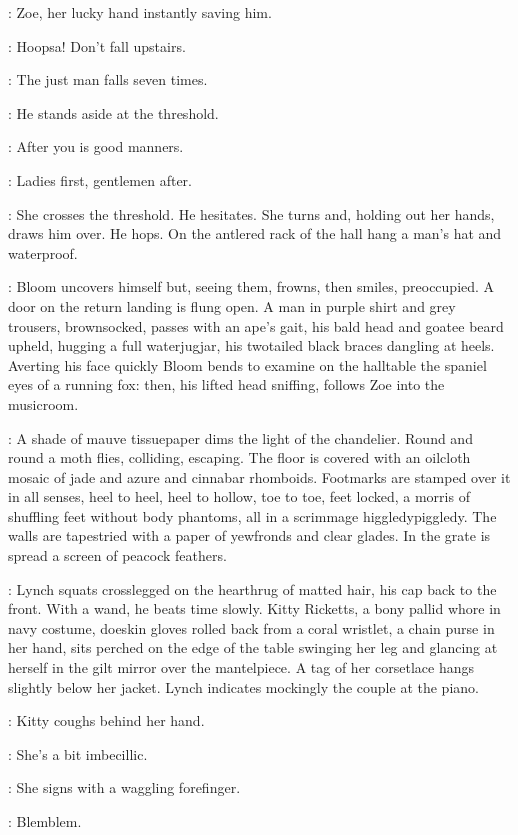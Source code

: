 :
Zoe, her lucky hand instantly saving him.

\Zoe:
Hoopsa!
Don't fall upstairs.

\Bloom:
The just man falls seven times.

:
He stands aside at the threshold.

\Bloom:
After you is good manners.

\Zoe:
Ladies first, gentlemen after.

:
She crosses the threshold.
He hesitates.
She turns and, holding out her hands, draws him over.
He hops.
On the antlered rack of the hall hang a man's hat and waterproof.

:
Bloom uncovers himself but, seeing them,
frowns, then smiles, preoccupied.
A door on the return landing is flung open.
A man in purple shirt and grey trousers, brownsocked,
passes with an ape's gait, his bald head and goatee beard upheld,
hugging a full waterjugjar, his twotailed black braces dangling at heels.
Averting his face quickly Bloom bends to examine on the halltable
the spaniel eyes of a running fox:
then, his lifted head sniffing, follows Zoe into the musicroom.

:
A shade of mauve tissuepaper dims the light of the chandelier.
Round and round a moth flies, colliding, escaping.
The floor is covered with an oilcloth mosaic of jade and azure and cinnabar rhomboids.
Footmarks are stamped over it in all senses, heel to heel, heel to hollow,
toe to toe, feet locked, a morris of shuffling feet without body phantoms,
all in a scrimmage higgledypiggledy.
The walls are tapestried with a paper of yewfronds and clear glades.
In the grate is spread a screen of peacock feathers.

:
Lynch squats crosslegged on the hearthrug of matted hair, his cap back to the front.
With a wand, he beats time slowly.
Kitty Ricketts, a bony pallid whore in navy costume,
doeskin gloves rolled back from a coral wristlet, a chain purse in her hand,
sits perched on the edge of the table swinging her leg
and glancing at herself in the gilt mirror over the mantelpiece.
A tag of her corsetlace hangs slightly below her jacket.
Lynch indicates mockingly the couple at the piano.

:
Kitty coughs behind her hand.

\Kitty:
She's a bit imbecillic.

:
She signs with a waggling forefinger.

\Kitty:
Blemblem.

